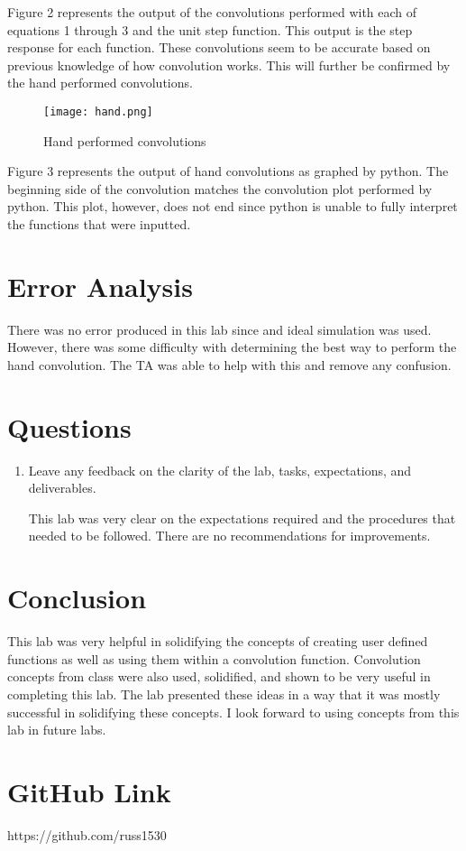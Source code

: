 \documentclass[12pt, titlepage]{article}
\begin{document}
        Figure 2 represents the output of the convolutions performed with each of equations 1 through 3 and the unit step function.  This output is the step response for each function.  These convolutions seem to be accurate based on previous knowledge of how convolution works.  This will further be confirmed by the hand performed convolutions.
        \clearpage
        \begin{figure}[h!]
            \centering
            \texttt{[image: hand.png]}
            \caption{Hand performed convolutions}
            \label{fig:my_label}
        \end{figure}
        
        Figure 3 represents the output of hand convolutions as graphed by python.  The beginning side of the convolution matches the convolution plot performed by python.  This plot, however, does not end since python is unable to fully interpret the functions that were inputted. 
        
        
        \section{Error Analysis}
        There was no error produced in this lab since and ideal simulation was used.  However, there was some difficulty with determining the best way to perform the hand convolution.  The TA was able to help with this and remove any confusion.
        
        \section{Questions}
        \begin{enumerate}
            \item Leave any feedback on the clarity of the lab, tasks, expectations, and deliverables.
            
            This lab was very clear on the expectations required and the procedures that needed to be followed.  There are no recommendations for improvements.
        \end{enumerate}
        
        \section{Conclusion}
        This lab was very helpful in solidifying the concepts of creating user defined functions as well as using them within a convolution function.  Convolution concepts from class were also used, solidified, and shown to be very useful in completing this lab.  The lab presented these ideas in a way that it was mostly successful in solidifying these concepts. I look forward to using concepts from this lab in future labs.
        
        \section{GitHub Link}
        https://github.com/russ1530
\end{document}

